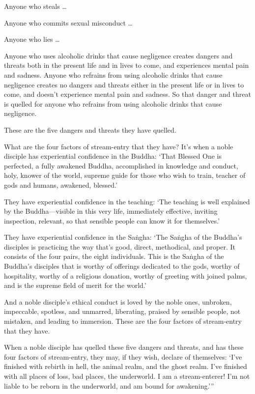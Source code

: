 \documentclass[12pt,openany]{book}%
\begin{document}
Anyone who steals … 

Anyone who commits sexual misconduct … 

Anyone who lies … 

Anyone who uses alcoholic drinks that cause negligence creates dangers and threats both in the present life and in lives to come, and experiences mental pain and sadness. Anyone who refrains from using alcoholic drinks that cause negligence creates no dangers and threats either in the present life or in lives to come, and doesn’t experience mental pain and sadness. So that danger and threat is quelled for anyone who refrains from using alcoholic drinks that cause negligence. 

These are the five dangers and threats they have quelled. 

What are the four factors of stream-entry that they have? It’s when a noble disciple has experiential confidence in the Buddha: ‘That Blessed One is perfected, a fully awakened Buddha, accomplished in knowledge and conduct, holy, knower of the world, supreme guide for those who wish to train, teacher of gods and humans, awakened, blessed.’ 

They have experiential confidence in the teaching: ‘The teaching is well explained by the Buddha—visible in this very life, immediately effective, inviting inspection, relevant, so that sensible people can know it for themselves.’ 

They have experiential confidence in the \textsanskrit{Saṅgha}: ‘The \textsanskrit{Saṅgha} of the Buddha’s disciples is practicing the way that’s good, direct, methodical, and proper. It consists of the four pairs, the eight individuals. This is the \textsanskrit{Saṅgha} of the Buddha’s disciples that is worthy of offerings dedicated to the gods, worthy of hospitality, worthy of a religious donation, worthy of greeting with joined palms, and is the supreme field of merit for the world.’ 

And a noble disciple’s ethical conduct is loved by the noble ones, unbroken, impeccable, spotless, and unmarred, liberating, praised by sensible people, not mistaken, and leading to immersion. These are the four factors of stream-entry that they have. 

When a noble disciple has quelled these five dangers and threats, and has these four factors of stream-entry, they may, if they wish, declare of themselves: ‘I’ve finished with rebirth in hell, the animal realm, and the ghost realm. I’ve finished with all places of loss, bad places, the underworld. I am a stream-enterer! I’m not liable to be reborn in the underworld, and am bound for awakening.’” 
\end{document}
